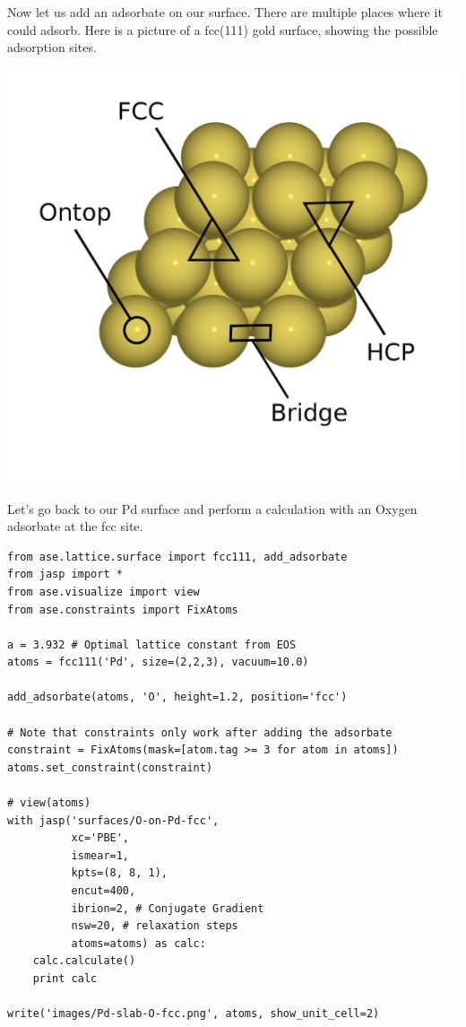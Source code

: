 \documentclass[11pt]{article}
\begin{document}
Now let us add an adsorbate on our surface. There are multiple places where it could adsorb. Here is a picture of a fcc(111) gold surface, showing the possible adsorption sites. 


\includegraphics[width=.9\linewidth]{./images/Au-slab-sites.png}


Let's go back to our Pd surface and perform a calculation with an Oxygen adsorbate at the fcc site.

\begin{verbatim}
from ase.lattice.surface import fcc111, add_adsorbate
from jasp import *
from ase.visualize import view
from ase.constraints import FixAtoms

a = 3.932 # Optimal lattice constant from EOS
atoms = fcc111('Pd', size=(2,2,3), vacuum=10.0)

add_adsorbate(atoms, 'O', height=1.2, position='fcc')

# Note that constraints only work after adding the adsorbate
constraint = FixAtoms(mask=[atom.tag >= 3 for atom in atoms])
atoms.set_constraint(constraint)

# view(atoms)
with jasp('surfaces/O-on-Pd-fcc',
          xc='PBE',
          ismear=1,
          kpts=(8, 8, 1),
          encut=400,
          ibrion=2, # Conjugate Gradient
          nsw=20, # relaxation steps
          atoms=atoms) as calc:
    calc.calculate()
    print calc
    
write('images/Pd-slab-O-fcc.png', atoms, show_unit_cell=2)
\end{verbatim}
\end{document}
